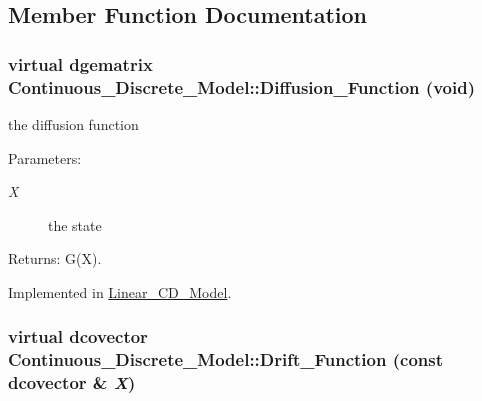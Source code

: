 \subsection{Member Function Documentation}
\hypertarget{class_continuous___discrete___model_e305ba43f31be1275ede8d3d48d1d779}{
\subsubsection[{Diffusion\_\-Function}]{\setlength{\rightskip}{0pt plus 5cm}virtual dgematrix Continuous\_\-Discrete\_\-Model::Diffusion\_\-Function (void)}}
\label{class_continuous___discrete___model_e305ba43f31be1275ede8d3d48d1d779}


the diffusion function 

\begin{Desc}
\item[Parameters:]
\begin{description}
\item[{\em X}]the state\end{description}
\end{Desc}
\begin{Desc}
\item[Returns:]G(X). \end{Desc}


Implemented in \hyperlink{class_linear___c_d___model_f6959eff1f30ff1772b05a45c5756054}{Linear\_\-CD\_\-Model}.\hypertarget{class_continuous___discrete___model_fb901d0d92470ee3e2f5a06f74336b7d}{
\subsubsection[{Drift\_\-Function}]{\setlength{\rightskip}{0pt plus 5cm}virtual dcovector Continuous\_\-Discrete\_\-Model::Drift\_\-Function (const dcovector \& {\em X})}}
\label{class_continuous___discrete___model_fb901d0d92470ee3e2f5a06f74336b7d}


